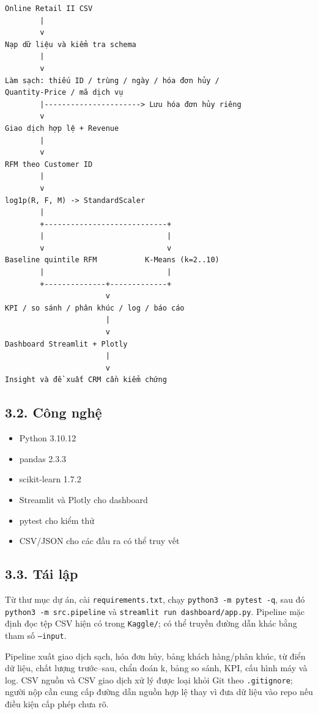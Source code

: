 \documentclass[a4paper]{article}
\begin{document}
\begin{verbatim}
Online Retail II CSV
        |
        v
Nạp dữ liệu và kiểm tra schema
        |
        v
Làm sạch: thiếu ID / trùng / ngày / hóa đơn hủy /
Quantity-Price / mã dịch vụ
        |----------------------> Lưu hóa đơn hủy riêng
        v
Giao dịch hợp lệ + Revenue
        |
        v
RFM theo Customer ID
        |
        v
log1p(R, F, M) -> StandardScaler
        |
        +----------------------------+
        |                            |
        v                            v
Baseline quintile RFM           K-Means (k=2..10)
        |                            |
        +--------------+-------------+
                       v
KPI / so sánh / phân khúc / log / báo cáo
                       |
                       v
Dashboard Streamlit + Plotly
                       |
                       v
Insight và đề xuất CRM cần kiểm chứng
\end{verbatim}

\subsection*{3.2. Công nghệ}

\begin{itemize}
\item Python 3.10.12
\item pandas 2.3.3
\item scikit-learn 1.7.2
\item Streamlit và Plotly cho dashboard
\item pytest cho kiểm thử
\item CSV/JSON cho các đầu ra có thể truy vết
\end{itemize}

\subsection*{3.3. Tái lập}

Từ thư mục dự án, cài \texttt{requirements.txt}, chạy \texttt{python3 -m pytest -q}, sau đó \texttt{python3 -m src.pipeline} và \texttt{streamlit run dashboard/app.py}. Pipeline mặc định đọc tệp CSV hiện có trong \texttt{Kaggle/}; có thể truyền đường dẫn khác bằng tham số \texttt{--input}.

Pipeline xuất giao dịch sạch, hóa đơn hủy, bảng khách hàng/phân khúc, từ điển dữ liệu, chất lượng trước--sau, chẩn đoán k, bảng so sánh, KPI, cấu hình máy và log. CSV nguồn và CSV giao dịch xử lý được loại khỏi Git theo \texttt{.gitignore}; người nộp cần cung cấp đường dẫn nguồn hợp lệ thay vì đưa dữ liệu vào repo nếu điều kiện cấp phép chưa rõ.
\end{document}
